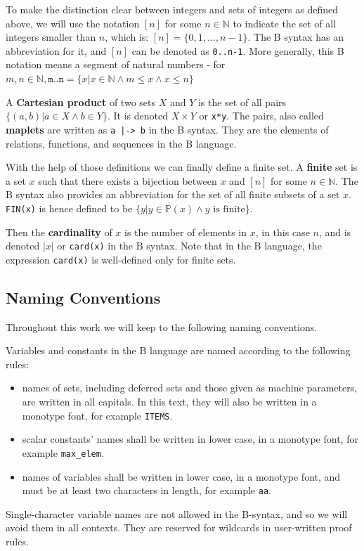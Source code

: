 \documentclass[12pt,journal,duplex]{IEEEtran}
\begin{document}
	To make the distinction clear between integers and sets of integers as defined above, we will use the notation $[n]$ for some $n \in \mathbb{N}$ to indicate the set of all integers smaller than $n$, which is: $[n] = \{0,1, ...,n-1\}$. The B syntax has an abbreviation for it, and $[n]$ can be denoted as \texttt{0..n-1}. More generally, this B notation means a segment of natural numbers - for $m, n \in \mathbb{N}, \texttt{m..n} = \{x | x \in \mathbb{N} \wedge m \leq x \wedge x \leq n\}$

	A \textbf{Cartesian product} of two sets $X$ and $Y$ is the set of all pairs $\{(a,b) | a \in X \wedge b \in Y  \}$. It is denoted $X \times Y$ or \texttt{x*y}. The pairs, also called \textbf{maplets} are written as \texttt{a~|->~b} in the B syntax. They are the elements of relations, functions, and sequences in the B language.

	With the help of those definitions we can finally define a finite set. A \textbf{finite} set is a set $x$ such that there exists a bijection between $x$ and $[n]$ for some $n \in \mathbb{N}$.  The B syntax also provides an abbreviation for the set of all finite subsets of a set $x$. \texttt{FIN(x)} is hence defined to be $\{y| y \in \mathbb{P}(x) \wedge y \text{ is finite} \}$.

	Then the \textbf{cardinality} of $x$ is the number of elements in $x$, in this case $n$, and is denoted $|x|$ or \texttt{card(x)} in the B syntax. Note that in the B language, the expression \texttt{card(x)} is well-defined only for finite sets.

	\subsection{Naming Conventions}
	Throughout this work we will keep to the following naming conventions.

	Variables and constants in the B language are named according to the following rules:
	\begin{itemize}
		\item names of sets, including deferred sets and those given as machine parameters, are written in all capitals. In this text, they will also be written in a monotype font, for example \texttt{ITEMS}.
		\item scalar constants' names shall be written in lower case, in a monotype font, for example \texttt{max\_elem}.
		\item names of variables shall be written in lower case, in a monotype font, and must be at least two characters in length, for example \texttt{aa}.
	\end{itemize}
	Single-character variable names are not allowed in the B-syntax, and so we will avoid them in all contexts. They are reserved for wildcards in user-written proof rules.
\end{document}

